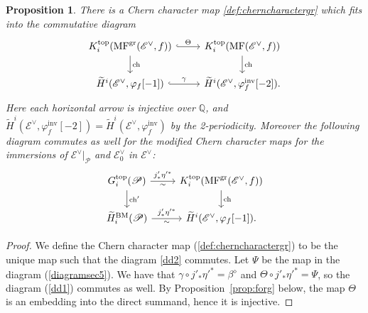 \documentclass [11pt,oneside,a4paper,mathscr]{amsart}
\newtheorem{prop}[thm]{Proposition}
\theoremstyle{definition}
\begin{document}
\begin{prop}\label{prop522}
There is a Chern character 
map \eqref{def:cherncharactergr} 
which fits into the commutative diagram
\begin{equation}\label{dd1}
    \begin{tikzcd}
         K^{\mathrm{top}}_i(\mathrm{MF}^{\mathrm{gr}}(\mathscr{E}^\vee, f))\arrow[d, "\mathrm{ch}"]\arrow[r, hook, "\Theta"]& K^{\mathrm{top}}_i(\mathrm{MF}(\mathscr{E}^\vee, f))\arrow[d, "\mathrm{ch}"]\\
         \widetilde{H}^i(\mathscr{E}^\vee, \varphi_f[-1])\arrow[r, hook, "\gamma"]& \widetilde{H}^i(\mathscr{E}^\vee, \varphi_f^{\mathrm{inv}}[-2]). 
    \end{tikzcd}
\end{equation}
Here each horizontal arrow is injective over $\mathbb{Q}$, and $\widetilde{H}^i(\mathscr{E}^\vee, \varphi_f^{\mathrm{inv}}[-2])=\widetilde{H}^i(\mathscr{E}^\vee, \varphi_f^{\mathrm{inv}})$
by the 2-periodicity. 
Moreover the following diagram commutes as well for
the modified Chern character maps 
for the immersions of $\mathscr{E}^\vee|_\mathscr{P}$ and $\mathscr{E}^\vee_0$ in $\mathscr{E}^\vee$:
\begin{equation}\label{dd2}
    \begin{tikzcd}
         G^{\mathrm{top}}_i(\mathscr{P})\arrow[r, "j'_*\eta'^*", "\sim"']\arrow[d, "\mathrm{ch}'"]& K^{\mathrm{top}}_i(\mathrm{MF}^{\mathrm{gr}}(\mathscr{E}^\vee, f))\arrow[d, "\mathrm{ch}"]\\
         \widetilde{H}^{\mathrm{BM}}_i(\mathscr{P})\arrow[r, "j'_*\eta'^*", "\sim"']&
         \widetilde{H}^i(\mathscr{E}^\vee, \varphi_f[-1]).
    \end{tikzcd}
\end{equation}
\end{prop}

\begin{proof}
We define the Chern character map (\ref{def:cherncharactergr}) 
to be the unique 
map
such that the diagram \eqref{dd2} commutes. 
Let $\Psi$ be the map in the diagram (\ref{diagramsec5}). 
We have that $\gamma\circ j'_*\eta'^*=\beta^\diamond$ and $\Theta\circ j'_*\eta'^*=\Psi$, so the diagram (\ref{dd1}) commutes as well. 
By Proposition~\ref{prop:forg} below, 
the map $\Theta$ is an embedding into the 
direct summand, hence it is injective. 
\end{proof}
\end{document}
